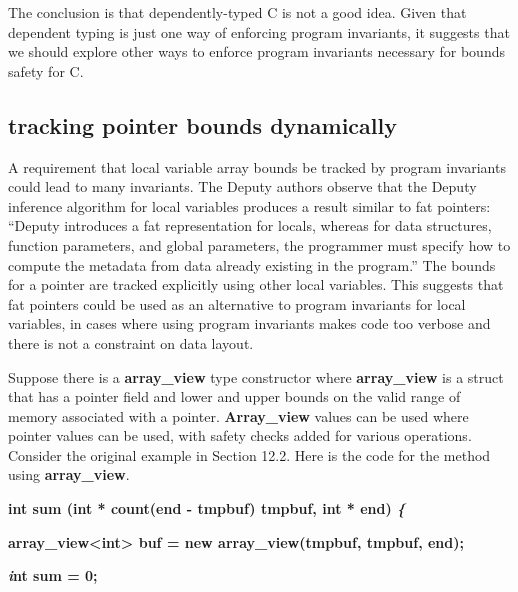 \documentclass[]{article}
\begin{document}
The conclusion is that dependently-typed C is not a good idea. Given
that dependent typing is just one way of enforcing program invariants,
it suggests that we should explore other ways to enforce program
invariants necessary for bounds safety for C.

\subsection{\texorpdfstring{\protect\hypertarget{ux5fToc420589170}{}{\protect\hypertarget{ux5fToc422906951}{}{\protect\hypertarget{ux5fToc424307674}{}{\protect\hypertarget{ux5fToc426641130}{}{\protect\hypertarget{ux5fToc435435005}{}{\protect\hypertarget{ux5fToc437460838}{}{\protect\hypertarget{ux5fToc440445519}{}{\protect\hypertarget{ux5fToc440449301}{}{\protect\hypertarget{ux5fToc440551951}{}{}}}}}}}}}tracking
pointer bounds
dynamically}{tracking pointer bounds dynamically}}\label{tracking-pointer-bounds-dynamically}

A requirement that local variable array bounds be tracked by program
invariants could lead to many invariants. The Deputy authors observe
that the Deputy inference algorithm for local variables produces a
result similar to fat pointers: ``Deputy introduces a fat representation
for locals, whereas for data structures, function parameters, and global
parameters, the programmer must specify how to compute the metadata from
data already existing in the program.'' The bounds for a pointer are
tracked explicitly using other local variables. This suggests that fat
pointers could be used as an alternative to program invariants for local
variables, in cases where using program invariants makes code too
verbose and there is not a constraint on data layout.

Suppose there is a \textbf{array\_view} type constructor where
\textbf{array\_view} is a struct that has a pointer field and lower and
upper bounds on the valid range of memory associated with a pointer.
\textbf{Array\_view} values can be used where pointer values can be
used, with safety checks added for various operations. Consider the
original example in Section 12.2. Here is the code for the method using
\textbf{array\_view}.

\textbf{int sum (int * count(end - tmpbuf) tmpbuf, int * end) \emph{\{}}

\textbf{array\_view\textless{}int\textgreater{} buf = new
array\_view(tmpbuf, tmpbuf, end);}

\textbf{\emph{i}nt sum = 0;}
\end{document}
